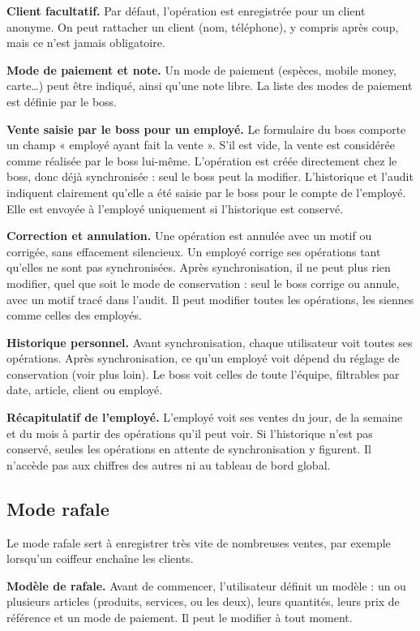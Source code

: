 \documentclass[11pt,a4paper]{article}
\newcommand{\fonc}[2]{\textbf{#1.} #2\par\vspace{0.2em}}
\begin{document}
	\fonc{Client facultatif}{Par défaut, l'opération est enregistrée pour un client anonyme. On peut rattacher un client (nom, téléphone), y compris après coup, mais ce n'est jamais obligatoire.}
	
	\fonc{Mode de paiement et note}{Un mode de paiement (espèces, mobile money, carte\dots) peut être indiqué, ainsi qu'une note libre. La liste des modes de paiement est définie par le boss.}
	
	\fonc{Vente saisie par le boss pour un employé}{Le formulaire du boss comporte un champ « employé ayant fait la vente ». S'il est vide, la vente est considérée comme réalisée par le boss lui-même. L'opération est créée directement chez le boss, donc déjà synchronisée : seul le boss peut la modifier. L'historique et l'audit indiquent clairement qu'elle a été saisie par le boss pour le compte de l'employé. Elle est envoyée à l'employé uniquement si l'historique est conservé.}
	
	\fonc{Correction et annulation}{Une opération est annulée avec un motif ou corrigée, sans effacement silencieux. Un employé corrige ses opérations tant qu'elles ne sont pas synchronisées. Après synchronisation, il ne peut plus rien modifier, quel que soit le mode de conservation : seul le boss corrige ou annule, avec un motif tracé dans l'audit. Il peut modifier toutes les opérations, les siennes comme celles des employés.}
	
	\fonc{Historique personnel}{Avant synchronisation, chaque utilisateur voit toutes ses opérations. Après synchronisation, ce qu'un employé voit dépend du réglage de conservation (voir plus loin). Le boss voit celles de toute l'équipe, filtrables par date, article, client ou employé.}
	
	\fonc{Récapitulatif de l'employé}{L'employé voit ses ventes du jour, de la semaine et du mois à partir des opérations qu'il peut voir. Si l'historique n'est pas conservé, seules les opérations en attente de synchronisation y figurent. Il n'accède pas aux chiffres des autres ni au tableau de bord global.}
	
	\subsection{Mode rafale}
	
	Le mode rafale sert à enregistrer très vite de nombreuses ventes, par exemple lorsqu'un coiffeur enchaîne les clients.
	
	\fonc{Modèle de rafale}{Avant de commencer, l'utilisateur définit un modèle : un ou plusieurs articles (produits, services, ou les deux), leurs quantités, leurs prix de référence et un mode de paiement. Il peut le modifier à tout moment.}
	
\end{document}
